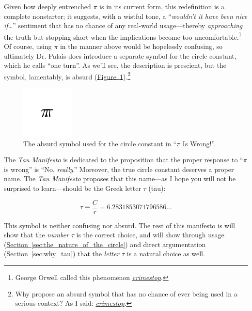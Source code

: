 \documentclass{article}
\begin{document}
\noindent Given how deeply entrenched $\pi$ is in its current form, this redefinition is a complete nonstarter; it suggests, with a wistful tone, a ``\emph{wouldn't it have been nice if\ldots}'' sentiment that has no chance of any real-world usage---thereby \emph{approaching} the truth but stopping short when the implications become too uncomfortable.\footnote{George Orwell called this phenomenon \href{http://en.wikipedia.org/wiki/Crimestop}{\emph{crimestop}}.} Of course, using $\pi$ in the manner above would be hopelessly confusing, so ultimately Dr. Palais does introduce a separate symbol for the circle constant, which he calls ``one turn''.  As we'll see, the description is prescient, but the symbol, lamentably, is absurd (\hyperref[fig:palais-tau]{Figure~}\ref{fig:palais-tau}).\footnote{Why propose an absurd symbol that has no chance of ever being used in a serious context? As I said: \href{http://en.wikipedia.org/wiki/Crimestop}{\emph{crimestop}}.}


\begin{figure}
\begin{center}
\includegraphics{images/figures/palais-tau.png}
\end{center}
\caption{The absurd symbol used for the circle constant in ``$\pi$ Is Wrong!''.\label{fig:palais-tau}}
\end{figure}

The \emph{Tau Manifesto} is dedicated to the proposition that the proper response to ``$\pi$ is wrong'' is ``No, \emph{really}.'' Moreover, the true circle constant deserves a proper name. The \emph{Tau Manifesto} proposes that this name---as I hope you will not be surprised to learn---should be the Greek letter $\tau$ (tau):

\[
  \tau \equiv \frac{C}{r} = 6.2831853071796586\ldots
\]

\noindent This symbol is neither confusing nor absurd. The rest of this manifesto is will show that the \emph{number} $\tau$ is the correct choice, and will show through usage (\hyperref[sec:the_nature_of_the_circle]{Section~}\ref{sec:the_nature_of_the_circle}) and direct argumentation (\hyperref[sec:why_tau]{Section~}\ref{sec:why_tau}) that the \emph{letter} $\tau$ is a natural choice as well.
\end{document}
